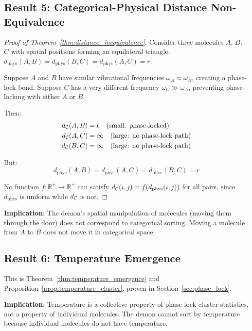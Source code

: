 \subsection{Result 5: Categorical-Physical Distance Non-Equivalence}

\begin{proof}[Proof of Theorem~\ref{thm:distance_inequivalence}]
Consider three molecules $A$, $B$, $C$ with spatial positions forming an equilateral triangle: $d_{\text{phys}}(A,B) = d_{\text{phys}}(B,C) = d_{\text{phys}}(A,C) = r$.

Suppose $A$ and $B$ have similar vibrational frequencies $\omega_A \approx \omega_B$, creating a phase-lock bond. Suppose $C$ has a very different frequency $\omega_C \gg \omega_A$, preventing phase-locking with either $A$ or $B$.

Then:
\begin{align}
d_{\mathcal{C}}(A, B) &= \epsilon \quad \text{(small: phase-locked)} \\
d_{\mathcal{C}}(A, C) &= \infty \quad \text{(large: no phase-lock path)} \\
d_{\mathcal{C}}(B, C) &= \infty \quad \text{(large: no phase-lock path)}
\end{align}

But:
\begin{equation}
d_{\text{phys}}(A, B) = d_{\text{phys}}(A, C) = d_{\text{phys}}(B, C) = r
\end{equation}

No function $f: \mathbb{R}^+ \to \mathbb{R}^+$ can satisfy $d_{\mathcal{C}}(i,j) = f(d_{\text{phys}}(i,j))$ for all pairs, since $d_{\text{phys}}$ is uniform while $d_{\mathcal{C}}$ is not.
\end{proof}

\textbf{Implication}: The demon's spatial manipulation of molecules (moving them through the door) does not correspond to categorical sorting. Moving a molecule from $A$ to $B$ does not move it in categorical space.

\subsection{Result 6: Temperature Emergence}

This is Theorem~\ref{thm:temperature_emergence} and Proposition~\ref{prop:temperature_cluster}, proven in Section~\ref{sec:phase_lock}.

\textbf{Implication}: Temperature is a collective property of phase-lock cluster statistics, not a property of individual molecules. The demon cannot sort by temperature because individual molecules do not have temperature.

